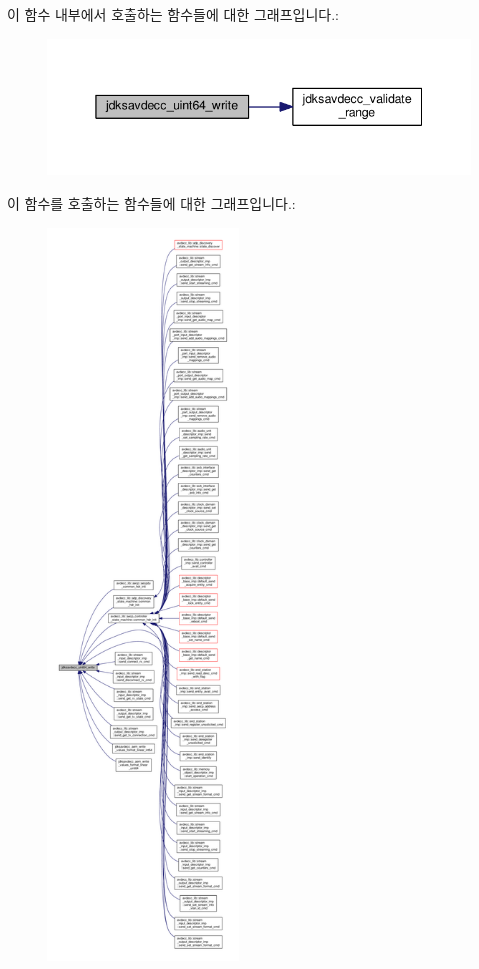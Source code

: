 이 함수 내부에서 호출하는 함수들에 대한 그래프입니다.\+:
\nopagebreak
\begin{figure}[H]
\begin{center}
\leavevmode
\includegraphics[width=345pt]{group__endian_gaa294fd85c2d887032dad294c6833c903_cgraph}
\end{center}
\end{figure}




이 함수를 호출하는 함수들에 대한 그래프입니다.\+:
\nopagebreak
\begin{figure}[H]
\begin{center}
\leavevmode
\includegraphics[height=550pt]{group__endian_gaa294fd85c2d887032dad294c6833c903_icgraph}
\end{center}
\end{figure}


